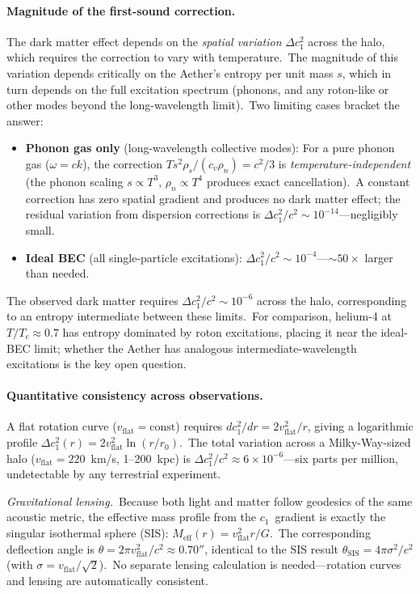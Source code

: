 ﻿\documentclass[12pt,letterpaper]{article}
\begin{document}
\paragraph{Magnitude of the first-sound correction.}
The dark matter effect depends on the \emph{spatial variation}
$\Delta c_1^2$ across the halo, which requires the correction to vary
with temperature.\ The magnitude of this variation depends critically on
the Aether's entropy per unit mass $s$, which in turn depends on the
full excitation spectrum (phonons, and any roton-like or other modes
beyond the long-wavelength limit).\ Two limiting cases bracket the answer:
%
\begin{itemize}[leftmargin=2em]
  \item \textbf{Phonon gas only} (long-wavelength collective modes):
    For a pure phonon gas ($\omega = ck$), the correction $Ts^2\rho_s/(c_v\rho_n) = c^2/3$
    is \emph{temperature-independent} (the phonon scaling $s \propto T^3$,
    $\rho_n \propto T^4$ produces exact cancellation).\ A constant correction
    has zero spatial gradient and produces no dark matter effect; the residual
    variation from dispersion corrections is
    $\Delta c_1^2/c^2 \sim 10^{-14}$---negligibly small.
  \item \textbf{Ideal BEC} (all single-particle excitations):
    $\Delta c_1^2/c^2 \sim 10^{-4}$---$\sim$$50\times$ larger than
    needed.
\end{itemize}
%
The observed dark matter requires $\Delta c_1^2/c^2 \sim 10^{-6}$ across
the halo, corresponding to an entropy intermediate between these limits.\
For comparison, helium-4 at $T/T_c \approx 0.7$ has entropy dominated by
roton excitations, placing it near the ideal-BEC limit; whether the Aether
has analogous intermediate-wavelength excitations is the key open question.

\paragraph{Quantitative consistency across observations.}
A flat rotation curve ($v_{\mathrm{flat}} = \mathrm{const}$) requires
$dc_1^2/dr = 2v_{\mathrm{flat}}^2/r$, giving a logarithmic profile
$\Delta c_1^2(r) = 2v_{\mathrm{flat}}^2\ln(r/r_0)$.\ The total variation
across a Milky-Way-sized halo ($v_{\mathrm{flat}} = 220$~km/s, 1--200~kpc)
is $\Delta c_1^2/c^2 \approx 6 \times 10^{-6}$---six parts per million,
undetectable by any terrestrial experiment.

\emph{Gravitational lensing.}\ Because both light and matter follow
geodesics of the same acoustic metric, the effective mass profile from
the $c_1$~gradient is exactly the singular isothermal sphere (SIS):
$M_{\mathrm{eff}}(r) = v_{\mathrm{flat}}^2 r/G$.\ The corresponding
deflection angle is $\theta = 2\pi v_{\mathrm{flat}}^2/c^2 \approx
0.70''$, identical to the SIS result $\theta_{\mathrm{SIS}} = 4\pi
\sigma^2/c^2$ (with $\sigma = v_{\mathrm{flat}}/\sqrt{2}$).\ No separate
lensing calculation is needed---rotation curves and lensing are
automatically consistent.
\end{document}
